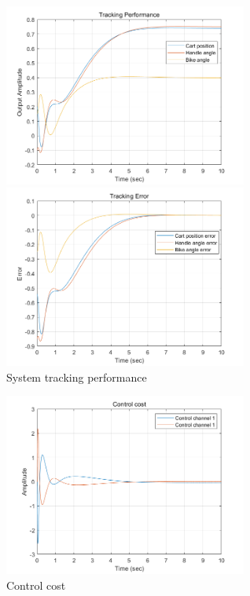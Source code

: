 \documentclass[hyperref]{article}
\theoremstyle{nonumberplain}
\begin{document}
	\begin{figure}[H]
		\centering
		\begin{minipage}[t]{0.48\textwidth}
			\centering
			\includegraphics[width=8cm]{fig46.png}
		\end{minipage}
		\begin{minipage}[t]{0.48\textwidth}
			\centering
			\includegraphics[width=8cm]{fig47.png}
		\end{minipage}
		\caption{System tracking performance}
		\label{fig25}
	\end{figure}
	
	\begin{figure}[H]
		\centering
		\includegraphics[width=8cm]{fig48.png}
		\caption{Control cost}
		\label{fig26}
	\end{figure}
	
\end{document}
